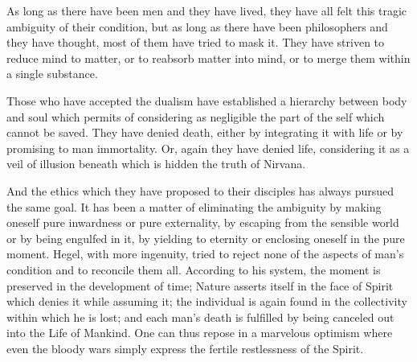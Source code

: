 \documentclass[11pt]{article}
\begin{document}
As long as there have been men and they have lived, they have all felt this tragic ambiguity of their condition, but as long as there have been philosophers and they have thought, most of them have tried to mask it. They have striven to reduce mind to matter, or to reabsorb matter into mind, or to merge them within a single substance.

Those who have accepted the dualism have established a hierarchy between body and soul which permits of considering as negligible the part of the self which cannot be saved. They have denied death, either by integrating it with life or by promising to man immortality. Or, again they have denied life, considering it as a veil of illusion beneath which is hidden the truth of Nirvana.

And the ethics which they have proposed to their disciples has always pursued the same goal. It has been a matter of eliminating the ambiguity by making oneself pure inwardness or pure externality, by escaping from the sensible world or by being engulfed in it, by yielding to eternity or enclosing oneself in the pure moment. Hegel, with more ingenuity, tried to reject none of the aspects of man’s condition and to reconcile them all. According to his system, the moment is preserved in the development of time; Nature asserts itself in the face of Spirit which denies it while assuming it; the individual is again found in the collectivity within which he is lost; and each man’s death is fulfilled by being canceled out into the Life of Mankind. One can thus repose in a marvelous optimism where even the bloody wars simply express the fertile restlessness of the Spirit.
\end{document}
